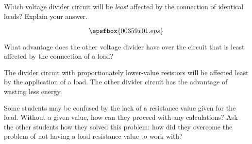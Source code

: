 

Which voltage divider circuit will be {\it least} affected by the connection of identical loads?  Explain your answer.

$$\epsfbox{00359x01.eps}$$

What advantage does the other voltage divider have over the circuit that is least affected by the connection of a load?







The divider circuit with proportionately lower-value resistors will be affected least by the application of a load.  The other divider circuit has the advantage of wasting less energy.







Some students may be confused by the lack of a resistance value given for the load.  Without a given value, how can they proceed with any calculations?  Ask the other students how they solved this problem: how did they overcome the problem of not having a load resistance value to work with?




